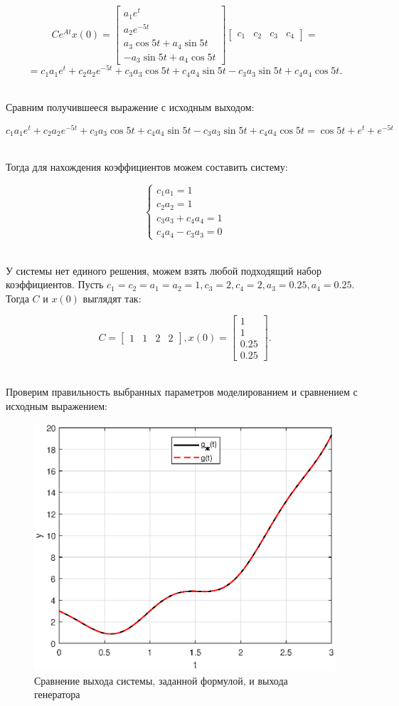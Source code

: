 \documentclass[a4paper]{article}
\begin{document}
$$
Ce^{At}x(0) = \begin{bmatrix}
    a_1e^t\\
    a_2e^{-5t} \\ 
    a_3\cos{5t} + a_4\sin{5t} \\ 
    -a_3\sin{5t} + a_4\cos{5t}
\end{bmatrix}\begin{bmatrix}
    c_1 & c_2 & c_3 & c_4
\end{bmatrix}=$$
$$=c_1a_1e^t + c_2a_2 e^{-5t}+c_3a_3\cos{5t} + c_4a_4\sin{5t}-c_3a_3\sin{5t}+c_4a_4\cos{5t}.
$$\ 

Сравним получившееся выражение с исходным выходом:

$$c_1a_1e^t + c_2a_2 e^{-5t}+c_3a_3\cos{5t} + c_4a_4\sin{5t}-c_3a_3\sin{5t}+c_4a_4\cos{5t} = \cos{5t} + e^{t} + e^{-5t}
$$\ 

Тогда для нахождения коэффициентов можем составить систему:

$$
\begin{cases}
    c_1a_1 = 1 \\
    c_2a_2 = 1 \\ 
    c_3a_3 + c_4a_4 = 1 \\
    c_4a_4 - c_3a_3 = 0
\end{cases}
$$\ 

У системы нет единого решения, можем взять любой подходящий набор коэффициентов. Пусть $c_1 = c_2 = a_1 = a_2 = 1, c_3 = 2, c_4 = 2, a_3 = 0.25, a_4 = 0.25$. Тогда $C$ и $x(0)$ выглядят так:

$$
C = \begin{bmatrix}
    1 & 1 & 2 & 2
\end{bmatrix}, x(0) = \begin{bmatrix}
    1 \\
    1 \\ 
    0.25 \\ 
    0.25
\end{bmatrix}.
$$\

Проверим правильность выбранных параметров моделированием и сравнением с исходным выражением:

\begin{figure}[H]
    \centering
    \includegraphics[width=0.65\linewidth]{ex3/compare.eps}
    \caption{Сравнение выхода системы, заданной формулой, и выхода генератора}
\end{figure}
\end{document}
